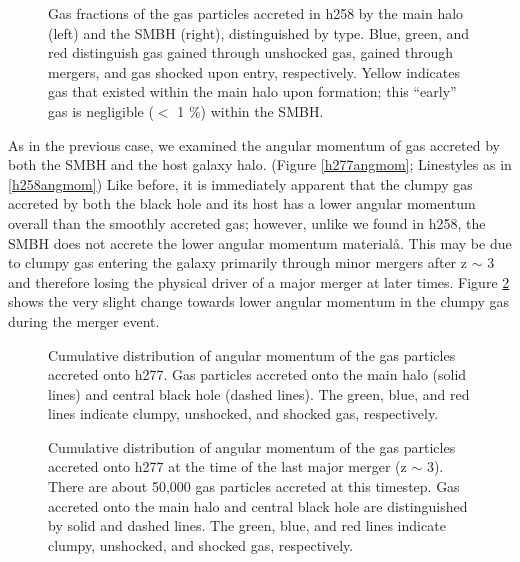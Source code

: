 \documentclass[12pt,headA,chapB]{fiskthesis}
\begin{document}
\begin{figure}[h]
\centerline{}
\caption[GASOLINE h258 Galaxy and SMBH Gas Fractions at z=0]{Gas fractions of the gas particles accreted in h258 by the main halo (left) and the SMBH (right), distinguished by type. Blue, green, and red distinguish gas gained through unshocked gas, gained through mergers, and gas shocked upon entry, respectively. Yellow indicates gas that existed within the main halo upon formation; this ``early'' gas is negligible ($<$ 1 \%) within the SMBH.}
\label{h277stackfrac} 
\end{figure}

As in the previous case, we examined the angular momentum of gas accreted by both the SMBH and the host galaxy halo. (Figure \ref{h277angmom}; Linestyles as in \ref{h258angmom}) Like before, it is immediately apparent that the clumpy gas accreted by both the black hole and its host has a lower angular momentum overall than the smoothly accreted gas; however, unlike we found in h258, the SMBH does not accrete the lower angular momentum materialå. This may be due to clumpy gas entering the galaxy primarily through minor mergers after z $\sim$ 3 and therefore losing the physical driver of a major merger at later times. Figure \ref{h277angmom_merger} shows the very slight change towards lower angular momentum in the clumpy gas during the merger event. 



\begin{figure}
\centerline{}
\caption[GASOLINE h258 Cumulative Angular Momentum Distribution]{ Cumulative distribution of angular momentum of the gas particles accreted onto h277.  Gas particles accreted onto the main halo (solid lines) and central black hole (dashed lines). The green, blue, and red lines indicate clumpy, unshocked, and shocked gas, respectively.}
\label{h277angmom} 

\centerline{}
\caption[GASOLINE h258 Merger Angular Momentum Distribution]{ Cumulative distribution of angular momentum of the gas particles accreted onto h277 at the time of the last major merger (z $\sim$ 3). There are about 50,000 gas particles accreted at this timestep. Gas accreted onto the main halo and central black hole are distinguished by solid and dashed lines. The green, blue, and red lines indicate clumpy, unshocked, and shocked gas, respectively.}
\label{h277angmom_merger} 
\end{figure}
\end{document}
